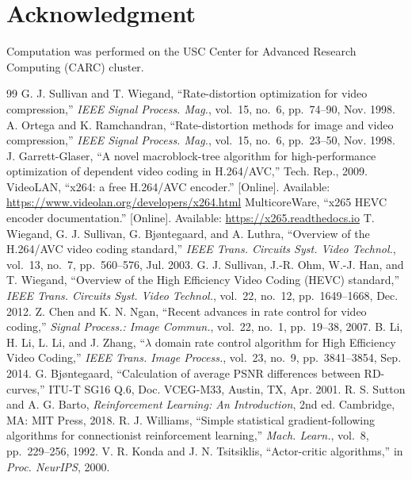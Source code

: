 \documentclass[conference]{IEEEtran}
\begin{document}
\section*{Acknowledgment}
Computation was performed on the USC Center for Advanced Research Computing (CARC) cluster.

\begin{thebibliography}{99}\footnotesize
{} G. J. Sullivan and T. Wiegand, ``Rate-distortion optimization for video compression,'' \emph{IEEE Signal Process. Mag.}, vol.~15, no.~6, pp.~74--90, Nov. 1998.
 A. Ortega and K. Ramchandran, ``Rate-distortion methods for image and video compression,'' \emph{IEEE Signal Process. Mag.}, vol.~15, no.~6, pp.~23--50, Nov. 1998.
 J. Garrett-Glaser, ``A novel macroblock-tree algorithm for high-performance optimization of dependent video coding in H.264/AVC,'' Tech. Rep., 2009.
 VideoLAN, ``x264: a free H.264/AVC encoder.'' [Online]. Available: \url{https://www.videolan.org/developers/x264.html}
 MulticoreWare, ``x265 HEVC encoder documentation.'' [Online]. Available: \url{https://x265.readthedocs.io}
 T. Wiegand, G. J. Sullivan, G. Bj{\o}ntegaard, and A. Luthra, ``Overview of the H.264/AVC video coding standard,'' \emph{IEEE Trans. Circuits Syst. Video Technol.}, vol.~13, no.~7, pp.~560--576, Jul. 2003.
 G. J. Sullivan, J.-R. Ohm, W.-J. Han, and T. Wiegand, ``Overview of the High Efficiency Video Coding (HEVC) standard,'' \emph{IEEE Trans. Circuits Syst. Video Technol.}, vol.~22, no.~12, pp.~1649--1668, Dec. 2012.
 Z. Chen and K. N. Ngan, ``Recent advances in rate control for video coding,'' \emph{Signal Process.: Image Commun.}, vol.~22, no.~1, pp.~19--38, 2007.
 B. Li, H. Li, L. Li, and J. Zhang, ``$\lambda$ domain rate control algorithm for High Efficiency Video Coding,'' \emph{IEEE Trans. Image Process.}, vol.~23, no.~9, pp.~3841--3854, Sep. 2014.
 G. Bj{\o}ntegaard, ``Calculation of average PSNR differences between RD-curves,'' ITU-T SG16 Q.6, Doc. VCEG-M33, Austin, TX, Apr. 2001.
 R. S. Sutton and A. G. Barto, \emph{Reinforcement Learning: An Introduction}, 2nd ed. Cambridge, MA: MIT Press, 2018.
 R. J. Williams, ``Simple statistical gradient-following algorithms for connectionist reinforcement learning,'' \emph{Mach. Learn.}, vol.~8, pp.~229--256, 1992.
 V. R. Konda and J. N. Tsitsiklis, ``Actor-critic algorithms,'' in \emph{Proc. NeurIPS}, 2000.

\end{thebibliography}
\end{document}
